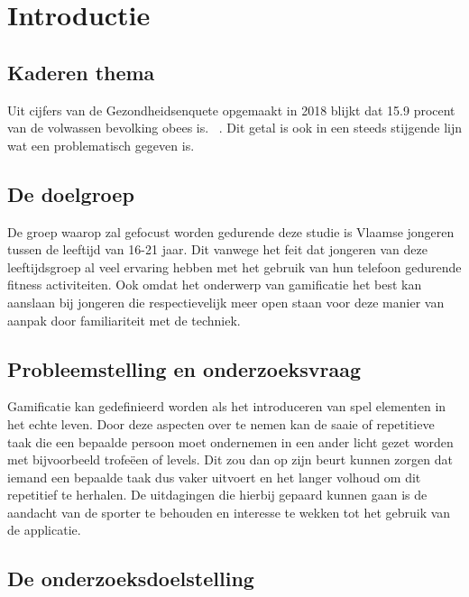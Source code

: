 
\section{Introductie}%
\label{sec:introductie}

\subsection{Kaderen thema}

Uit cijfers van de Gezondheidsenquete opgemaakt in 2018 blijkt dat 15.9 procent van de volwassen bevolking obees is. ~\autocite{Drieskens2018}.  Dit getal is ook in een steeds stijgende lijn wat een problematisch gegeven is. 

\subsection{De doelgroep}

De groep waarop zal gefocust worden gedurende deze studie is Vlaamse jongeren tussen de leeftijd van 16-21 jaar. Dit vanwege het feit dat jongeren van deze leeftijdsgroep al veel ervaring hebben met het gebruik van hun telefoon gedurende fitness activiteiten. Ook omdat het onderwerp van gamificatie het best kan aanslaan bij jongeren die respectievelijk meer open staan voor deze manier van aanpak door familiariteit met de techniek. 

\subsection{Probleemstelling en onderzoeksvraag}

Gamificatie kan gedefinieerd worden als het introduceren van spel elementen in het echte leven. \autocite{Deterding2011} Door deze aspecten over te nemen kan de saaie of repetitieve taak die een bepaalde persoon moet ondernemen in een ander licht gezet worden met bijvoorbeeld trofeëen of levels. Dit zou dan op zijn beurt kunnen zorgen dat iemand een bepaalde taak dus vaker uitvoert en het langer volhoud om dit repetitief te herhalen. De uitdagingen die hierbij gepaard kunnen gaan is de aandacht van de sporter te behouden en interesse te wekken tot het gebruik van de applicatie. 

\subsection{De onderzoeksdoelstelling}

